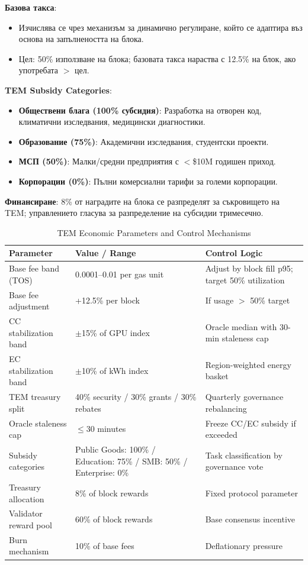 \documentclass[11pt]{article}
\begin{document}
\textbf{Базова такса}:
\begin{itemize}[noitemsep]
  \item Изчислява се чрез механизъм за динамично регулиране, който се адаптира въз основа на запълнеността на блока.
  \item Цел: 50\% използване на блока; базовата такса нараства с 12.5\% на блок, ако употребата $>$ цел.
\end{itemize}

\textbf{TEM Subsidy Categories}:
\begin{itemize}[noitemsep]
  \item \textbf{Обществени блага (100\% субсидия)}: Разработка на отворен код, климатични изследвания, медицински диагностики.
  \item \textbf{Образование (75\%)}: Академични изследвания, студентски проекти.
  \item \textbf{МСП (50\%)}: Малки/средни предприятия с $<$\$10M годишен приход.
  \item \textbf{Корпорации (0\%)}: Пълни комерсиални тарифи за големи корпорации.
\end{itemize}

\textbf{Финансиране}: 8\% от наградите на блока се разпределят за съкровището на TEM; управлението гласува за разпределение на субсидии тримесечно.

\begin{table}[H]
\centering
\caption{TEM Economic Parameters and Control Mechanisms}
\label{tab:tem-parameters}
\begin{tabular}{@{}p{}p{}p{}@{}}
\toprule
\textbf{Parameter} & \textbf{Value / Range} & \textbf{Control Logic} \\ \midrule
Base fee band (TOS) & 0.0001--0.01 per gas unit & Adjust by block fill p95; target 50\% utilization \\
Base fee adjustment & +12.5\% per block & If usage $>$ 50\% target \\
CC stabilization band & $\pm$15\% of GPU index & Oracle median with 30-min staleness cap \\
EC stabilization band & $\pm$10\% of kWh index & Region-weighted energy basket \\
TEM treasury split & 40\% security / 30\% grants / 30\% rebates & Quarterly governance rebalancing \\
Oracle staleness cap & $\le$30 minutes & Freeze CC/EC subsidy if exceeded \\
Subsidy categories & Public Goods: 100\% / Education: 75\% / SMB: 50\% / Enterprise: 0\% & Task classification by governance vote \\
Treasury allocation & 8\% of block rewards & Fixed protocol parameter \\
Validator reward pool & 60\% of block rewards & Base consensus incentive \\
Burn mechanism & 10\% of base fees & Deflationary pressure \\
\bottomrule
\end{tabular}
\end{table}
\end{document}
